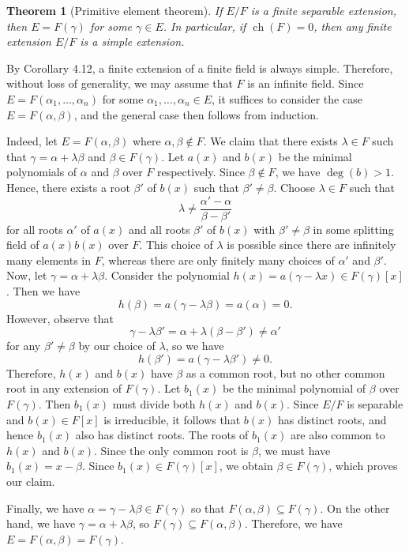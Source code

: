 \documentclass[10pt]{article}
\makeatletter
\DeclareMathOperator{\ch}{ch}
\theoremstyle{newstyle}
\newtheorem{thm}{Theorem}[section]
\newenvironment{pf}[1][\proofname]{\par
  \pushQED{\qed}%
  \normalfont \topsep0\p@\relax
  \trivlist
  \item[\hskip\labelsep\scshape
  #1\@addpunct{.}]\ignorespaces
}{%
  \popQED\endtrivlist\@endpefalse
}
\makeatother
\begin{document}
\begin{thm}[Primitive element theorem]
If $E/F$ is a finite separable extension, then $E = F(\gamma)$ for some $\gamma \in E$. 
In particular, if $\ch(F) = 0$, then any finite extension $E/F$ is a simple extension. 
\end{thm}
\begin{pf}
By Corollary 4.12, a finite extension of a finite field is always simple. Therefore, 
without loss of generality, we may assume that $F$ is an infinite field. 
Since $E = F(\alpha_1, \dots, \alpha_n)$ for some $\alpha_1, \dots, \alpha_n \in E$, 
it suffices to consider the case $E = F(\alpha, \beta)$, and the general case then follows from 
induction. 

Indeed, let $E = F(\alpha, \beta)$ where $\alpha, \beta \notin F$. We claim that there 
exists $\lambda \in F$ such that $\gamma = \alpha + \lambda\beta$ and $\beta \in F(\gamma)$. 
Let $a(x)$ and $b(x)$ be the minimal polynomials of $\alpha$ and $\beta$ over $F$ respectively. 
Since $\beta \notin F$, we have $\deg(b) > 1$. Hence, there exists a root $\beta'$ of 
$b(x)$ such that $\beta' \neq \beta$. Choose $\lambda \in F$ such that 
\[ \lambda \neq \frac{\alpha' - \alpha}{\beta - \beta'} \]
for all roots $\alpha'$ of $a(x)$ and all roots $\beta'$ of $b(x)$ with $\beta' \neq \beta$ 
in some splitting field of $a(x)b(x)$ over $F$. This choice of $\lambda$ is possible 
since there are infinitely many elements in $F$, whereas there are only finitely many choices of 
$\alpha'$ and $\beta'$. Now, let $\gamma = \alpha + \lambda\beta$. Consider the polynomial 
$h(x) = a(\gamma - \lambda x) \in F(\gamma)[x]$. Then we have 
\[ h(\beta) = a(\gamma - \lambda\beta) = a(\alpha) = 0. \]
However, observe that 
\[ \gamma - \lambda\beta' = \alpha + \lambda(\beta - \beta') \neq \alpha' \]
for any $\beta' \neq \beta$ by our choice of $\lambda$, so we have 
\[ h(\beta') = a(\gamma - \lambda\beta') \neq 0. \]
Therefore, $h(x)$ and $b(x)$ have $\beta$ as a common root, but no other common root 
in any extension of $F(\gamma)$. Let $b_1(x)$ be the minimal polynomial of $\beta$ over $F(\gamma)$. 
Then $b_1(x)$ must divide both $h(x)$ and $b(x)$. Since $E/F$ is separable and $b(x) \in F[x]$ 
is irreducible, it follows that $b(x)$ has distinct roots, and hence $b_1(x)$ also has distinct 
roots. The roots of $b_1(x)$ are also common to $h(x)$ and $b(x)$. Since the only common root 
is $\beta$, we must have $b_1(x) = x - \beta$. Since $b_1(x) \in 
F(\gamma)[x]$, we obtain $\beta \in F(\gamma)$, which proves our claim. 

Finally, we have $\alpha = \gamma - \lambda\beta \in F(\gamma)$ so that $F(\alpha, \beta) \subseteq 
F(\gamma)$. On the other hand, we have $\gamma = \alpha + \lambda\beta$, so 
$F(\gamma) \subseteq F(\alpha, \beta)$. Therefore, we have $E = F(\alpha, \beta) = F(\gamma)$. 
\end{pf}
\end{document}
